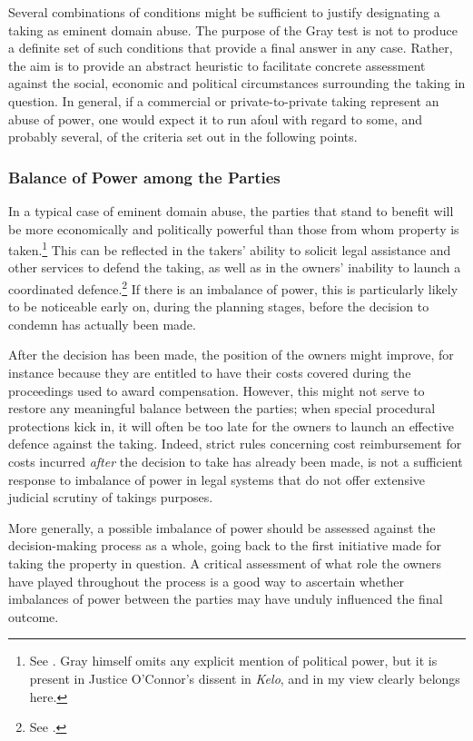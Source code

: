 Several combinations of conditions might be sufficient to justify designating a taking as eminent domain abuse. The purpose of the Gray test is not to produce a definite set of such conditions that provide a final answer in any case. Rather, the aim is to provide an abstract heuristic to facilitate concrete assessment against the social, economic and political circumstances surrounding the taking in question. In general, if a commercial or private-to-private taking represent an abuse of power, one would expect it to run afoul with regard to some, and probably several, of the criteria set out in the following points.

\subsubsection*{Balance of Power among the Parties}

In a typical case of eminent domain abuse, the parties that stand to benefit will be more economically and politically powerful than those from whom property is taken.\footnote{See \cite[30-31]{gray11}. Gray himself omits any explicit mention of political power, but it is present in Justice O'Connor's dissent in {\it Kelo}, and in my view clearly belongs here.} This can be reflected in the takers' ability to solicit legal assistance and other services to defend the taking, as well as in the  owners' inability to launch a coordinated defence.\footnote{See \cite[30-31]{gray11}.} If there is an imbalance of power, this is particularly likely to be noticeable early on, during the planning stages, before the decision to condemn has actually been made. 

After the decision has been made, the position of the owners might improve, for instance because they are entitled to have their costs covered during the proceedings used to award compensation. However, this might not serve to restore any meaningful balance between the parties; when special procedural protections kick in, it will often be too late for the owners to launch an effective defence against the taking. Indeed, strict rules concerning cost reimbursement for costs incurred {\it after} the decision to take has already been made, is not a sufficient response to imbalance of power in legal systems that do not offer extensive judicial scrutiny of takings purposes.

More generally, a possible imbalance of power should be assessed against the decision-making process as a whole, going back to the first initiative made for taking the property in question. A critical assessment of what role the owners have played throughout the process is a good way to ascertain whether imbalances of power between the parties may have unduly influenced the final outcome.

